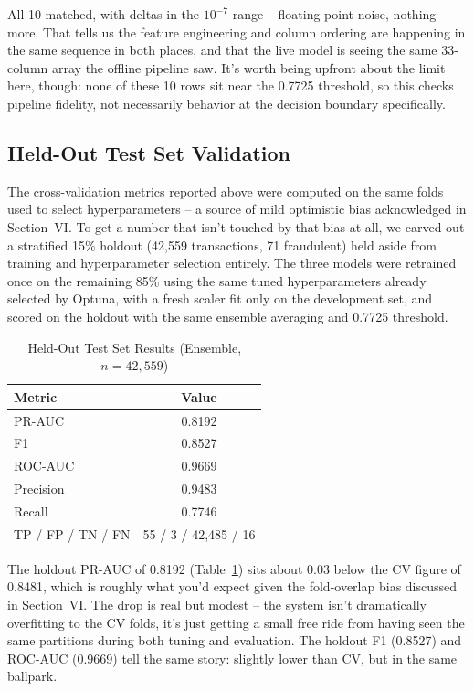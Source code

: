 \documentclass[conference]{IEEEtran}
\begin{document}
All 10 matched, with deltas in the $10^{-7}$ range -- floating-point noise, nothing more. That tells us the feature engineering and column ordering are happening in the same sequence in both places, and that the live model is seeing the same 33-column array the offline pipeline saw. It's worth being upfront about the limit here, though: none of these 10 rows sit near the 0.7725 threshold, so this checks pipeline fidelity, not necessarily behavior at the decision boundary specifically.

\subsection{Held-Out Test Set Validation}
The cross-validation metrics reported above were computed on the same folds used to select hyperparameters -- a source of mild optimistic bias acknowledged in Section~VI. To get a number that isn't touched by that bias at all, we carved out a stratified 15\% holdout (42,559 transactions, 71 fraudulent) held aside from training and hyperparameter selection entirely. The three models were retrained once on the remaining 85\% using the same tuned hyperparameters already selected by Optuna, with a fresh scaler fit only on the development set, and scored on the holdout with the same ensemble averaging and 0.7725 threshold.

\begin{table}[htbp]
\caption{Held-Out Test Set Results (Ensemble, $n=42{,}559$)}\label{tab:holdout}
\begin{center}
\begin{tabular}{lc}
\toprule
\textbf{Metric} & \textbf{Value} \\
\midrule
PR-AUC   & 0.8192 \\
F1       & 0.8527 \\
ROC-AUC  & 0.9669 \\
Precision & 0.9483 \\
Recall    & 0.7746 \\
\midrule
TP / FP / TN / FN & 55 / 3 / 42{,}485 / 16 \\
\bottomrule
\end{tabular}

\end{center}
\end{table}

The holdout PR-AUC of 0.8192 (Table~\ref{tab:holdout}) sits about 0.03 below the CV figure of 0.8481, which is roughly what you'd expect given the fold-overlap bias discussed in Section~VI. The drop is real but modest -- the system isn't dramatically overfitting to the CV folds, it's just getting a small free ride from having seen the same partitions during both tuning and evaluation. The holdout F1 (0.8527) and ROC-AUC (0.9669) tell the same story: slightly lower than CV, but in the same ballpark.
\end{document}
